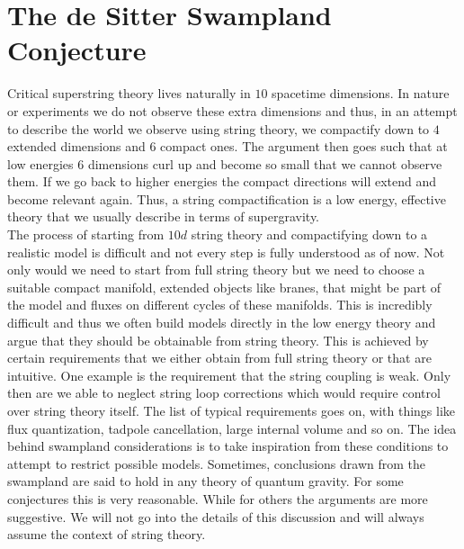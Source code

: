 \documentclass[a4paper,12pt]{report}
\begin{document}
\chapter{The de Sitter Swampland Conjecture}
\label{sec:swamplandconjectures}
Critical superstring theory lives naturally in $10$ spacetime dimensions. In nature or experiments we do not observe these extra dimensions and thus, in an attempt to describe the world we observe using string theory, we compactify down to $4$ extended dimensions and $6$ compact ones. The argument then goes such that at low energies $6$ dimensions curl up and become so small that we cannot observe them. If we go back to higher energies the compact directions will extend and become relevant again. Thus, a string compactification is a low energy, effective theory that we usually describe in terms of supergravity.\\
The process of starting from $10d$ string theory and compactifying down to a realistic model is difficult and not every step is fully understood as of now. Not only would we need to start from full string theory but we need to choose a suitable compact manifold, extended objects like branes, that might be part of the model and fluxes on different cycles of these manifolds. This is incredibly difficult and thus we often build models directly in the low energy theory and argue that they should be obtainable from string theory. This is achieved by certain requirements that we either obtain from full string theory or that are intuitive. One example is the requirement that the string coupling is weak. Only then are we able to neglect string loop corrections which would require control over string theory itself. The list of typical requirements goes on, with things like flux quantization, tadpole cancellation, large internal volume and so on. The idea behind swampland considerations is to take inspiration from these conditions to attempt to restrict possible models. Sometimes, conclusions drawn from the swampland are said to hold in any theory of quantum gravity. For some conjectures this is very reasonable. While for others the arguments are more suggestive. We will not go into the details of this discussion and will always assume the context of string theory.\\
\end{document}
